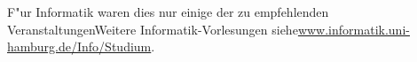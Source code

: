 \begin{tabularx}{\textwidth}{|l|X|X|X|}
%
			&&&\\
\hline
\end{tabularx}

F"ur Informatik waren dies nur einige der zu empfehlenden VeranstaltungenWeitere Informatik-Vorlesungen siehe\url{www.informatik.uni-hamburg.de/Info/Studium}.

